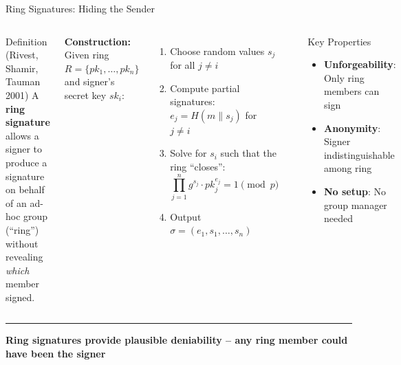\documentclass[8pt,aspectratio=169]{beamer}
\newcommand{\bottomnote}[1]{\vfill\vspace{-2mm}\textcolor{mllavender2}{\rule{\textwidth}{0.4pt}}\vspace{1mm}\footnotesize\textbf{#1}}
\begin{document}
\begin{frame}{Ring Signatures: Hiding the Sender}
\begin{columns}[T]
\begin{block}{\footnotesize Definition (Rivest, Shamir, Tauman 2001)}
\footnotesize
A \textbf{ring signature} allows a signer to produce a signature on behalf of an ad-hoc group (``ring'') without revealing \emph{which} member signed.
\end{block}
\vspace{0.1cm}
\footnotesize
\textbf{Construction:}
Given ring $R = \{pk_1, \ldots, pk_n\}$ and signer's secret key $sk_i$:
\begin{enumerate}
\item Choose random values $s_j$ for all $j \neq i$
\item Compute partial signatures: $e_j = H(m \| s_j)$ for $j \neq i$
\item Solve for $s_i$ such that the ring ``closes'':
$$\prod_{j=1}^{n} g^{s_j} \cdot pk_j^{e_j} = 1 \pmod{p}$$
\item Output $\sigma = (e_1, s_1, \ldots, s_n)$
\end{enumerate}
\begin{center}
\end{center}
\vspace{0.1cm}
\begin{exampleblock}{\footnotesize Key Properties}
\footnotesize
\begin{itemize}
\item \textbf{Unforgeability}: Only ring members can sign
\item \textbf{Anonymity}: Signer indistinguishable among ring
\item \textbf{No setup}: No group manager needed
\end{itemize}
\end{exampleblock}
\end{columns}
\bottomnote{Ring signatures provide plausible deniability -- any ring member could have been the signer}
\end{frame}
\end{document}
